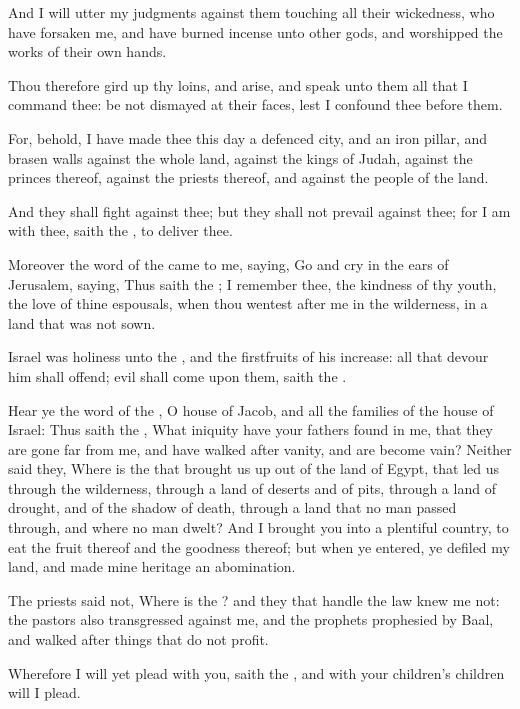 \Verse And I will utter my judgments against them touching all their wickedness, who have forsaken me, and have burned incense unto other gods, and worshipped the works of their own hands.

\Verse Thou therefore gird up thy loins, and arise, and speak unto them all that I command thee: be not dismayed at their faces, lest I confound thee before them.

\Verse For, behold, I have made thee this day a defenced city, and an iron pillar, and brasen walls against the whole land, against the kings of Judah, against the princes thereof, against the priests thereof, and against the people of the land.

\Verse And they shall fight against thee; but they shall not prevail against thee; for I am with thee, saith the \LORD, to deliver thee.


\Chapter
\Verse Moreover the word of the \LORD came to me, saying, \Verse Go and cry in the ears of Jerusalem, saying, Thus saith the \LORD; I remember thee, the kindness of thy youth, the love of thine espousals, when thou wentest after me in the wilderness, in a land that was not sown.

\Verse Israel was holiness unto the \LORD, and the firstfruits of his increase: all that devour him shall offend; evil shall come upon them, saith the \LORD.

\Verse Hear ye the word of the \LORD, O house of Jacob, and all the families of the house of Israel: \Verse Thus saith the \LORD, What iniquity have your fathers found in me, that they are gone far from me, and have walked after vanity, and are become vain?  \Verse Neither said they, Where is the \LORD that brought us up out of the land of Egypt, that led us through the wilderness, through a land of deserts and of pits, through a land of drought, and of the shadow of death, through a land that no man passed through, and where no man dwelt?  \Verse And I brought you into a plentiful country, to eat the fruit thereof and the goodness thereof; but when ye entered, ye defiled my land, and made mine heritage an abomination.

\Verse The priests said not, Where is the \LORD? and they that handle the law knew me not: the pastors also transgressed against me, and the prophets prophesied by Baal, and walked after things that do not profit.

\Verse Wherefore I will yet plead with you, saith the \LORD, and with your children's children will I plead.

